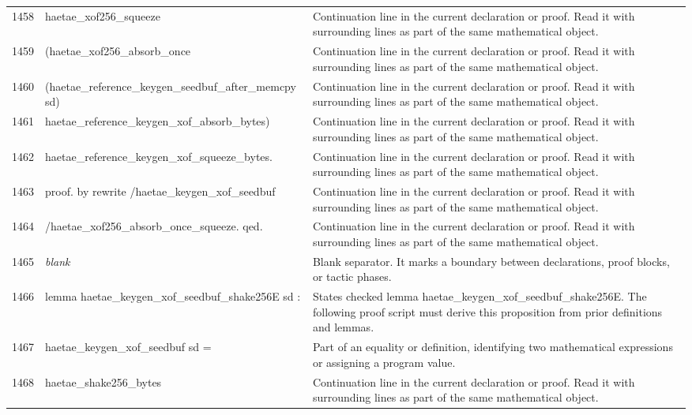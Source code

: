 \documentclass[10pt]{article}
\begin{document}
\begin{longtable}{r L{0.53\textwidth} L{0.37\textwidth}}
1458 & {\ttfamily\scriptsize   haetae\_xof256\_squeeze} & Continuation line in the current declaration or proof.  Read it with surrounding lines as part of the same mathematical object. \\
1459 & {\ttfamily\scriptsize     (haetae\_xof256\_absorb\_once} & Continuation line in the current declaration or proof.  Read it with surrounding lines as part of the same mathematical object. \\
1460 & {\ttfamily\scriptsize       (haetae\_reference\_keygen\_seedbuf\_after\_memcpy sd)} & Continuation line in the current declaration or proof.  Read it with surrounding lines as part of the same mathematical object. \\
1461 & {\ttfamily\scriptsize       haetae\_reference\_keygen\_xof\_absorb\_bytes)} & Continuation line in the current declaration or proof.  Read it with surrounding lines as part of the same mathematical object. \\
1462 & {\ttfamily\scriptsize     haetae\_reference\_keygen\_xof\_squeeze\_bytes.} & Continuation line in the current declaration or proof.  Read it with surrounding lines as part of the same mathematical object. \\
1463 & {\ttfamily\scriptsize proof. by rewrite /haetae\_keygen\_xof\_seedbuf} & Continuation line in the current declaration or proof.  Read it with surrounding lines as part of the same mathematical object. \\
1464 & {\ttfamily\scriptsize                   /haetae\_xof256\_absorb\_once\_squeeze. qed.} & Continuation line in the current declaration or proof.  Read it with surrounding lines as part of the same mathematical object. \\
1465 & {\ttfamily\scriptsize \emph{blank}} & Blank separator.  It marks a boundary between declarations, proof blocks, or tactic phases. \\
1466 & {\ttfamily\scriptsize lemma haetae\_keygen\_xof\_seedbuf\_shake256E sd :} & States checked lemma haetae\_keygen\_xof\_seedbuf\_shake256E.  The following proof script must derive this proposition from prior definitions and lemmas. \\
1467 & {\ttfamily\scriptsize   haetae\_keygen\_xof\_seedbuf sd =} & Part of an equality or definition, identifying two mathematical expressions or assigning a program value. \\
1468 & {\ttfamily\scriptsize   haetae\_shake256\_bytes} & Continuation line in the current declaration or proof.  Read it with surrounding lines as part of the same mathematical object. \\

\end{longtable}
\end{document}
